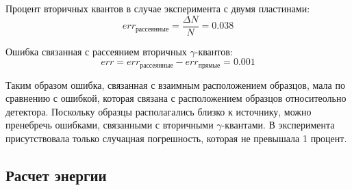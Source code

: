 \documentclass[a4paper,12pt]{article} %
\begin{document}
			Процент вторичных квантов в случае эксперимента с двумя пластинами:
			\begin{equation}
				err_{\text{рассеянные}} = \frac{\Delta N}{N} = 0.038
			\end{equation}\par
			Ошибка связанная с рассеянием вторичных $\gamma$-квантов:
			\begin{equation}
				err = err_{\text{рассеянные}} - err_{\text{прямые}} = 0.001
			\end{equation}\par
			Таким образом ошибка, связанная с взаимным расположением образцов, мала по сравнению с ошибкой, которая связана с расположением образцов относитеольно детектора.
			Поскольку образцы располагались близко к источнику, можно пренебречь ошибками, связанными с вторичными $\gamma$-квантами.
			В эксперимента присутствовала только случацная погрешность, которая не превышала 1 процент.\par
		
		\subsection{Расчет энергии}
\end{document}
